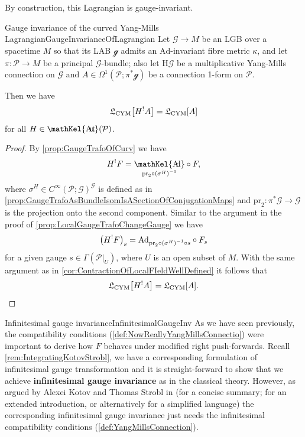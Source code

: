 \documentclass[reqno,a4paper,oneside]{amsart}
\theoremstyle{plain}
\theoremstyle{remark}
\theoremstyle{definition}
\DeclareMathOperator{\sAut}{\mathKel{A\mkern-5.5mu u\mkern-4mu t\mkern-1.5mu}}
\DeclareMathOperator{\sAd}{\mathKel{A\mkern-5.5mu d}}
\begin{document}
By construction, this Lagrangian is gauge-invariant.

\begin{theorems}{Gauge invariance of the curved Yang-Mills Lagrangian}{GaugeInvarianceOfLagrangian}
Let $\mathcal{G} \to M$ be an LGB over a spacetime $M$ so that its LAB $\mathcal{g}$ admits an $\mathrm{Ad}$-invariant fibre metric $\kappa$, and let $\pi\colon\mathcal{P} \to M$ be a principal $\mathcal{G}$-bundle; also let $\mathrm{H}\mathcal{G}$ be a multiplicative Yang-Mills connection on $\mathcal{G}$ and $A \in \Omega^1(\mathcal{P}; \pi^*\mathcal{g})$ be a connection 1-form on $\mathcal{P}$.

Then we have
\begin{equation*}
\mathfrak{L}_{\mathrm{CYM}}\mleft[ H^!A \mright]
=
\mathfrak{L}_{\mathrm{CYM}}[A]
\end{equation*}
for all $H \in \sAut(\mathcal{P})$.
\end{theorems}

\begin{proof}
\leavevmode\newline
By \ref{prop:GaugeTrafoOfCurv} we have 
\begin{equation*}
H^!F
=
{\sAd_{\mathrm{pr}_2\circ\mleft(\sigma^H\mright)^{-1}}} \circ F,
\end{equation*}
where $\sigma^H \in C^\infty(\mathcal{P}; \mathcal{G})^{\mathcal{G}}$ is defined as in \ref{prop:GaugeTrafoAsBundleIsomIsASectionOfConjugationMaps} and $\mathrm{pr}_2: \pi^*\mathcal{G} \to \mathcal{G}$ is the projection onto the second component. Similar to the argument in the proof of \ref{prop:LocalGaugeTrafoChangeGauge} we have
\begin{equation*}
\mleft( H^!F \mright)_s
=
\mathrm{Ad}_{\mathrm{pr}_2\circ\mleft(\sigma^H\mright)^{-1} \circ s} \circ F_s
\end{equation*}
for a given gauge $s \in \Gamma(\mathcal{P}|_U)$, where $U$ is an open subset of $M$. With the same argument as in \ref{cor:ContractionOfLocalFIeldWellDefined} it follows that
\begin{equation*}
\mathfrak{L}_{\mathrm{CYM}}\mleft[ H^!A \mright]
=
\mathfrak{L}_{\mathrm{CYM}}[A].
\end{equation*}
\end{proof}

\begin{remarks}{Infinitesimal gauge invariance}{InfinitesimalGaugeInv}
As we have seen previously, the compatibility conditions (\ref{def:NowReallyYangMillsConnectio}) were important to derive how $F$ behaves under modified right push-forwards. Recall \ref{rem:IntegratingKotovStrobl}, we have a corresponding formulation of infinitesimal gauge transformation and it is straight-forward to show that we achieve \textbf{infinitesimal gauge invariance} as in the classical theory. However, as argued by Alexei Kotov and Thomas Strobl in \cite{CurvedYMH} (for a concise summary; \cite{MyThesis} for an extended introduction, or alternatively \cite{My1stpaper} for a simplified language) the corresponding infinitesimal gauge invariance just needs the infinitesimal compatibility conditions (\ref{def:YangMillsConnection}).
\end{remarks}
\end{document}
